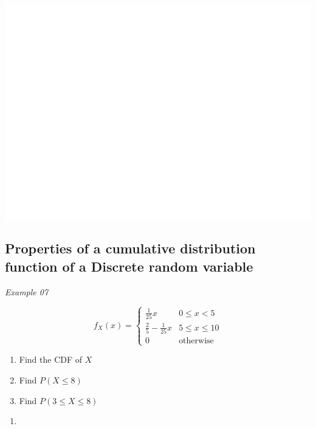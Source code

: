 \documentclass[]{book}
\providecommand{\tightlist}{%
  \setlength{\itemsep}{0pt}\setlength{\parskip}{0pt}}
\begin{document}
\begin{center}\includegraphics[width=1\linewidth]{figure/Ch1box13-1} \end{center}

\hypertarget{properties-of-a-cumulative-distribution-function-of-a-discrete-random-variable}{%
\subsection{Properties of a cumulative distribution function of a Discrete random variable}\label{properties-of-a-cumulative-distribution-function-of-a-discrete-random-variable}}

\emph{Example 07}

\begin{equation}
f_X(x) =
\begin{cases} 
\frac{1}{25}x & 0\leq x < 5\\
\frac{2}{5}- \frac{1}{25}x & 5\leq x \leq 10\\
0 & \text{otherwise}
\end{cases}
\end{equation}

\begin{enumerate}
\def\labelenumi{\arabic{enumi}.}
\tightlist
\item
  Find the CDF of \(X\)
\item
  Find \(P(X\leq 8)\)
\item
  Find \(P(3\leq X\leq 8)\)
\end{enumerate}

\newpage

\begin{enumerate}
\def\labelenumi{\arabic{enumi}.}
\item
\end{enumerate}
\end{document}
